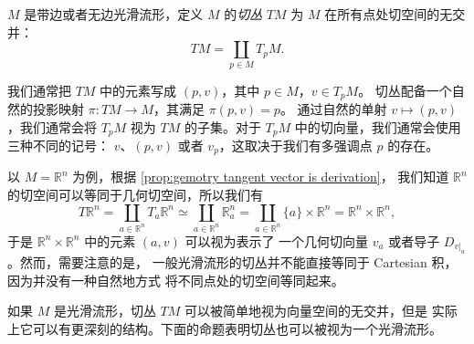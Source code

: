 \documentclass[fontset=none]{Notes}
\begin{document}
$M$ 是带边或者无边光滑流形，定义 $M$ 的\emph{切丛} $TM$ 为 $M$
在所有点处切空间的无交并：
\[
  TM=\coprod_{p\in M} T_pM.  
\]

我们通常把 $TM$ 中的元素写成 $(p,v)$，其中 $p\in M$，$v\in T_pM$。
切丛配备一个自然的投影映射 $\pi:TM\to M$，其满足 $\pi(p,v)=p$。
通过自然的单射 $v\mapsto (p,v)$，我们通常会将 $T_pM$ 视为 $TM$
的子集。对于 $T_pM$ 中的切向量，我们通常会使用三种不同的记号：
$v$、$(p,v)$ 或者 $v_p$，这取决于我们有多强调点 $p$ 的存在。

以 $M=\mathbb{R}^n$ 为例，根据 \autoref{prop:gemotry tangent vector is derivation}，
我们知道 $\mathbb{R}^n$ 的切空间可以等同于几何切空间，所以我们有
\[
  T\mathbb{R}^n=\coprod_{a\in\mathbb{R}^n}T_a\mathbb{R}^n
  \simeq\coprod_{a\in\mathbb{R}^n}\mathbb{R}_a^n=\coprod_{a\in\mathbb{R}^n}
  \{a\} \times\mathbb{R}^n=\mathbb{R}^n\times\mathbb{R}^n, 
\] 
于是 $\mathbb{R}^n\times\mathbb{R}^n$ 中的元素 $(a,v)$ 可以视为表示了
一个几何切向量 $v_a$ 或者导子 $D_{v|_a}$。然而，需要注意的是，
一般光滑流形的切丛并不能直接等同于 Cartesian 积，因为并没有一种自然地方式
将不同点处的切空间等同起来。

如果 $M$ 是光滑流形，切丛 $TM$ 可以被简单地视为向量空间的无交并，但是
实际上它可以有更深刻的结构。下面的命题表明切丛也可以被视为一个光滑流形。
 
\end{document}
